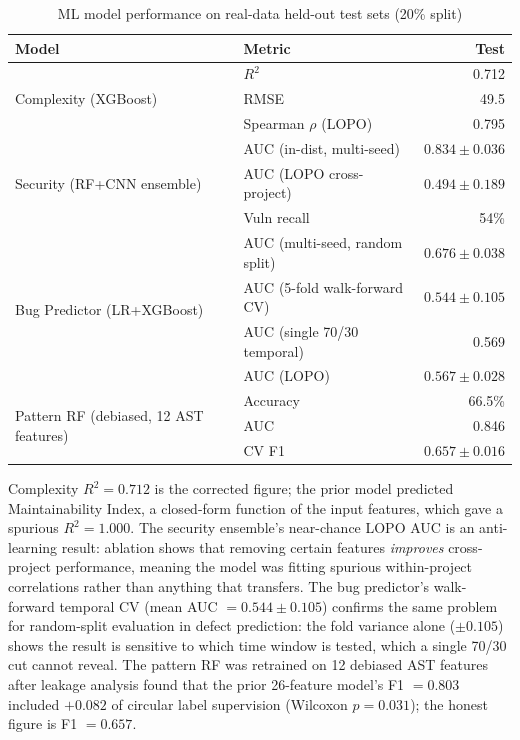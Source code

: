 \documentclass[12pt, oneside]{report}
\begin{document}
\begin{table}[H]
\centering
\caption{ML model performance on real-data held-out test sets (20\% split)}
\label{tab:modelperf}
\begin{tabular}{@{}llr@{}}
\toprule
\textbf{Model} & \textbf{Metric} & \textbf{Test} \\
\midrule
\multirow{3}{*}{Complexity (XGBoost)} & $R^2$            & 0.712 \\
 & RMSE                                                  & 49.5  \\
 & Spearman $\rho$ (LOPO)                               & 0.795 \\
\midrule
\multirow{3}{*}{Security (RF+CNN ensemble)} & AUC (in-dist, multi-seed)  & $0.834\pm0.036$ \\
 & AUC (LOPO cross-project)                              & $0.494\pm0.189$ \\
 & Vuln recall                                           & 54\%  \\
\midrule
\multirow{4}{*}{Bug Predictor (LR+XGBoost)} & AUC (multi-seed, random split)  & $0.676\pm0.038$ \\
 & AUC (5-fold walk-forward CV)                          & $0.544\pm0.105$ \\
 & AUC (single 70/30 temporal)                           & 0.569 \\
 & AUC (LOPO)                                            & $0.567\pm0.028$ \\
\midrule
\multirow{3}{*}{Pattern RF (debiased, 12 AST features)} & Accuracy & 66.5\% \\
 & AUC    & 0.846 \\
 & CV F1  & $0.657\pm0.016$ \\
\bottomrule
\end{tabular}
\end{table}

Complexity $R^2 = 0.712$ is the corrected figure; the prior model predicted Maintainability
Index, a closed-form function of the input features, which gave a spurious $R^2 = 1.000$.
The security ensemble's near-chance LOPO AUC is an anti-learning result: ablation shows
that removing certain features \emph{improves} cross-project performance, meaning the
model was fitting spurious within-project correlations rather than anything that transfers.
The bug predictor's walk-forward temporal CV (mean AUC $= 0.544 \pm 0.105$) confirms
the same problem for random-split evaluation in defect prediction: the fold variance alone
($\pm0.105$) shows the result is sensitive to which time window is tested, which a single
70/30 cut cannot reveal. The pattern RF was retrained on 12 debiased AST features after
leakage analysis found that the prior 26-feature model's F1 $= 0.803$ included
$+0.082$ of circular label supervision (Wilcoxon $p = 0.031$); the honest figure is
F1 $= 0.657$.
\end{document}
